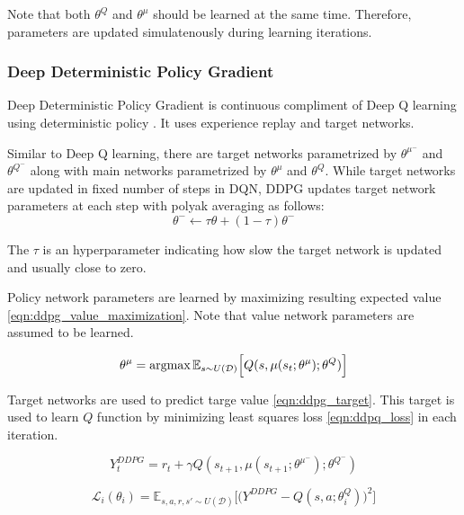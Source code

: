 Note that both $\theta^Q$ and $\theta^\mu$ should be learned at the same time. Therefore, parameters are updated simulatenously during learning iterations.

\subsubsection{Deep Deterministic Policy Gradient}
Deep Deterministic Policy Gradient is continuous compliment of Deep Q learning using deterministic policy \cite{lillicrap_continuous_2019}. It uses experience replay and target networks.  

Similar to Deep Q learning, there are target networks parametrized by $\theta^{\mu^-}$ and $\theta^{Q^-}$ along with main networks parametrized by $\theta^{\mu}$ and $\theta^{Q}$. While target networks are updated in fixed number of steps in DQN, DDPG updates target network parameters at each step with polyak averaging as follows:
%
\begin{equation}
\label{eqn:target_update}
\theta^- \leftarrow \tau \theta + (1-\tau) \theta^-
\end{equation}

The $\tau$ is an hyperparameter indicating how slow the target network is updated and usually close to zero.

Policy network parameters are learned by maximizing resulting expected value \ref{eqn:ddpg_value_maximization}. Note that value network parameters are assumed to be learned.

\begin{equation}
\label{eqn:ddpg_value_maximization}
\theta^\mu = \operatorname{\textup{argmax}} \mathbb{E}_{s \sim U(\mathcal{D})} \Big[ Q(s, \mu(s_t;\theta^\mu);\theta^Q) \Big]
\end{equation}
 
Target networks are used to predict targe value \ref{eqn:ddpg_target}. This target is used to learn $Q$ function by minimizing least squares loss \ref{eqn:ddpq_loss} in each iteration.

\begin{equation}
\label{eqn:ddpg_target}
Y_t^{DDPG} = r_t + \gamma Q(s_{t+1}, \mu(s_{t+1};\theta^{\mu^-});\theta^{Q^-})
\end{equation}

\begin{equation}
\label{eqn:ddpg_loss}
\mathcal{L}_i(\theta_i) = \mathbb{E}_{s,a,r,s'\sim U(\mathcal{D})}\Big[\big( Y^{DDPG} - Q(s,a;\theta^Q_i) \big) ^ 2 \Big]
\end{equation}

